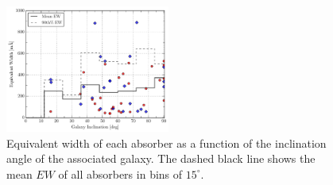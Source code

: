 \documentclass[iop]{emulateapj-rtx4}
\begin{document}


%


\begin{figure}[h!]
        \centering
        \includegraphics[width=0.48\textwidth]{W(fancy_inc)_mean_90_hist.pdf}
        \caption{\small{Equivalent width of each absorber as a function of the inclination angle of the associated galaxy. The dashed black line shows the mean $EW$ of all absorbers in bins of $15^{\circ}$.}}
        \label{ew_vs_inclination}
        \vspace{2pt}
\end{figure}
\end{document}
